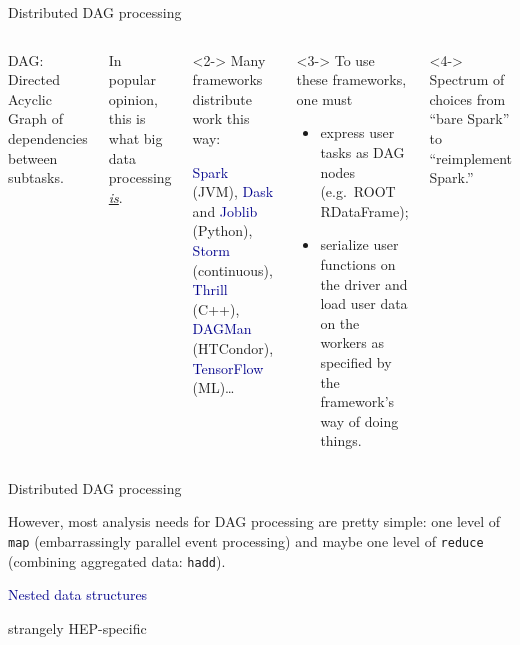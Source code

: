 \documentclass[aspectratio=169]{beamer}
\begin{document}
\begin{frame}{Distributed DAG processing}
\begin{columns}
DAG: Directed Acyclic Graph of dependencies between subtasks.

In popular opinion, this is what big data processing \underline{\it is}.

\vspace{0.5 cm}
\begin{uncoverenv}<2->
Many frameworks distribute work this way:

\vspace{0.2 cm}
\hfill \begin{minipage}{0.95\linewidth}
\textcolor{darkblue}{Spark} (JVM), \textcolor{darkblue}{Dask} and \textcolor{darkblue}{Joblib} (Python), \textcolor{darkblue}{Storm} (continuous), \textcolor{darkblue}{Thrill} (C++), \textcolor{darkblue}{DAGMan} (HTCondor), \textcolor{darkblue}{TensorFlow} (ML)\ldots
\end{minipage}
\end{uncoverenv}

\vspace{0.5 cm}
\begin{uncoverenv}<3->
To use these frameworks, one must
\begin{itemize}
\item express user tasks as DAG nodes (e.g.\ ROOT RDataFrame);
\item serialize user functions on the driver and load user data on the workers as specified by the framework's way of doing things.
\end{itemize}
\end{uncoverenv}

\vspace{0.5 cm}
\begin{uncoverenv}<4->
Spectrum of choices from ``bare Spark'' to ``reimplement Spark.''
\end{uncoverenv}
\end{columns}
\end{frame}

\begin{frame}{Distributed DAG processing}
\Large
\vspace{0.5 cm}
\begin{center}
However, most analysis needs for DAG processing are pretty simple: one level of {\tt\large map} (embarrassingly parallel event processing) and maybe one level of {\tt\large reduce} (combining aggregated data: {\tt\large hadd}).
\end{center}
\end{frame}

\begin{frame}{}
\huge
\vspace{0.5 cm}
\begin{center}
\textcolor{darkblue}{Nested data structures}

\large
\vspace{0.5 cm}
strangely HEP-specific
\end{center}
\end{frame}
\end{document}
